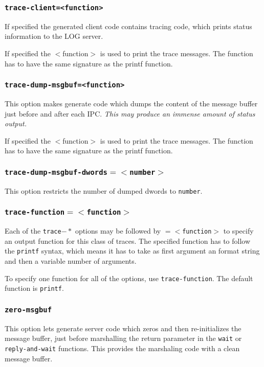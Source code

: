 \subsubsection{{\tt trace-client=<function>}}
If specified the generated client code contains tracing code, which prints
status information to the LOG server.

If specified the $<$function$>$ is used to print the trace messages. The function
has to have the same signature as the printf function.

\subsubsection{{\tt trace-dump-msgbuf=<function>}}
This option makes \dice{} generate code which dumps the content of the message
buffer just before and after each IPC. {\it This may produce an immense amount
of status output.} 

If specified the $<$function$>$ is used to print the trace messages. The function
has to have the same signature as the printf function.

\subsubsection{{\tt trace-dump-msgbuf-dwords$=<$number$>$}}
This option restricts the number of dumped dwords to {\tt number}.

\subsubsection{{\tt trace-function$=<$function$>$}}
Each of the {\tt trace$-*$} options may be followed by {\tt $=<$function$>$}
to specify an output function for this class of traces. The specified function
has to follow the \verb|printf| syntax, which means it has to take as first
argument an format string and then a variable number of arguments.

To specify one function for all of the options, use {\tt trace-function}.
The default function is \verb|printf|.

\subsubsection{{\tt zero-msgbuf}}
This option lets \dice{} generate server code which zeros and then
re-initializes the message buffer, just before marshalling the return parameter 
in the \verb|wait| or 
\verb|reply-and-wait| functions. This provides
the marshaling code with a clean message buffer.

